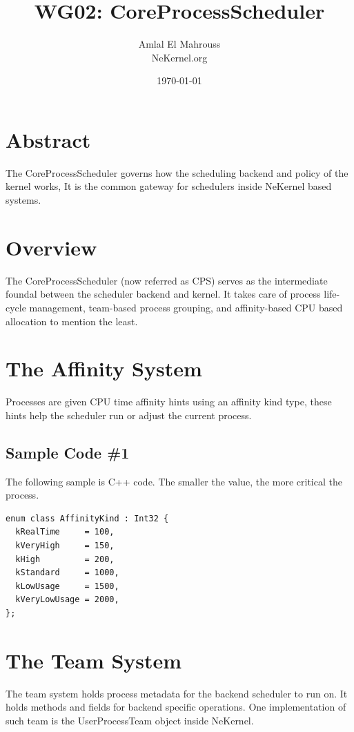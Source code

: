 \documentclass{article}
\title{WG02: CoreProcessScheduler}
\author{Amlal El Mahrouss\\NeKernel.org}
\date{\today}
\begin{document}
\maketitle

\section{Abstract}

{The CoreProcessScheduler governs how the scheduling backend and policy of the kernel works, It is the common gateway for schedulers inside NeKernel based systems.}

\section{Overview}

{The CoreProcessScheduler (now referred as CPS) serves as the intermediate foundal between the scheduler backend and kernel.} {It takes care of process life-cycle management, team-based process grouping, and affinity-based CPU based allocation to mention the least.}

\section{The Affinity System}

{Processes are given CPU time affinity hints using an affinity kind type, these hints help the scheduler run or adjust the current process.}

\subsection{Sample Code \#1}

{The following sample is C++ code.} {The smaller the value, the more critical the process.}

\begin{verbatim}
enum class AffinityKind : Int32 {
  kRealTime     = 100,
  kVeryHigh     = 150,
  kHigh         = 200,
  kStandard     = 1000,
  kLowUsage     = 1500,
  kVeryLowUsage = 2000,
};
\end{verbatim}

\section{The Team System}

{The team system holds process metadata for the backend scheduler to run on. It holds methods and fields for backend specific operations.} {One implementation of such team is the UserProcessTeam object inside NeKernel.}
\end{document}
